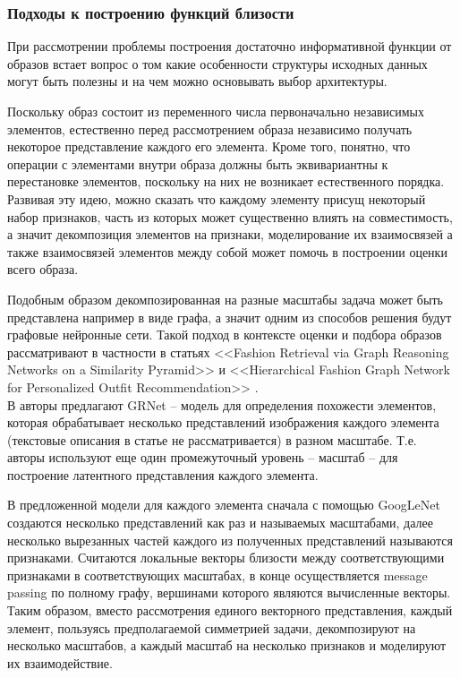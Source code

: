 \documentclass[a4paper,14pt]{extarticle}
\begin{document}
		
		
			\subsubsection{Подходы к построению функций близости}
				При рассмотрении проблемы построения достаточно информативной функции от образов встает вопрос о том какие особенности структуры исходных данных могут быть полезны и на чем можно основывать выбор архитектуры. 
				
				Поскольку образ состоит из переменного числа первоначально независимых элементов, естественно перед рассмотрением образа независимо получать некоторое представление каждого его элемента. Кроме того, понятно, что операции с элементами внутри образа должны быть эквивариантны к перестановке элементов, поскольку на них не возникает естественного порядка. Развивая эту идею, можно сказать что каждому элементу присущ некоторый набор признаков, часть из которых может существенно влиять на совместимость, а значит декомпозиция элементов на признаки, моделирование их взаимосвязей а также взаимосвязей элементов между собой может помочь в построении оценки всего образа. 
				
				Подобным образом декомпозированная на разные масштабы задача может быть представлена например в виде графа, а значит одним из способов решения будут графовые нейронные сети. Такой подход в контексте оценки и подбора образов рассматривают в частности в статьях <<Fashion Retrieval via Graph Reasoning Networks on a Similarity
				Pyramid>> \cite{https://doi.org/10.48550/arXiv.1908.11754} и <<Hierarchical Fashion Graph Network for Personalized Outfit
				Recommendation>> \cite{https://doi.org/10.48550/arXiv.2005.12566}. \\
				
				В \cite{https://doi.org/10.48550/arXiv.1908.11754} авторы предлагают GRNet – модель для определения похожести элементов, которая обрабатывает несколько представлений изображения каждого элемента (текстовые описания в статье не рассматривается) в разном масштабе. Т.е. авторы используют еще один промежуточный уровень -- масштаб -- для построение латентного представления каждого элемента. 
				
				В предложенной модели для каждого элемента сначала с помощью GoogLeNet \cite{https://doi.org/10.48550/arXiv.1409.4842} создаются несколько представлений как раз и называемых масштабами, далее несколько вырезанных частей каждого из полученных представлений называются признаками. Считаются локальные векторы близости между соответствующими признаками в соответствующих масштабах, в конце осуществляется message passing \cite{https://doi.org/10.48550/arXiv.1704.01212} по полному графу, вершинами которого являются вычисленные векторы. Таким образом, вместо рассмотрения единого векторного представления, каждый элемент, пользуясь предполагаемой симметрией задачи, декомпозируют на несколько масштабов, а каждый масштаб на несколько признаков и моделируют их взаимодействие.
				
\end{document}
